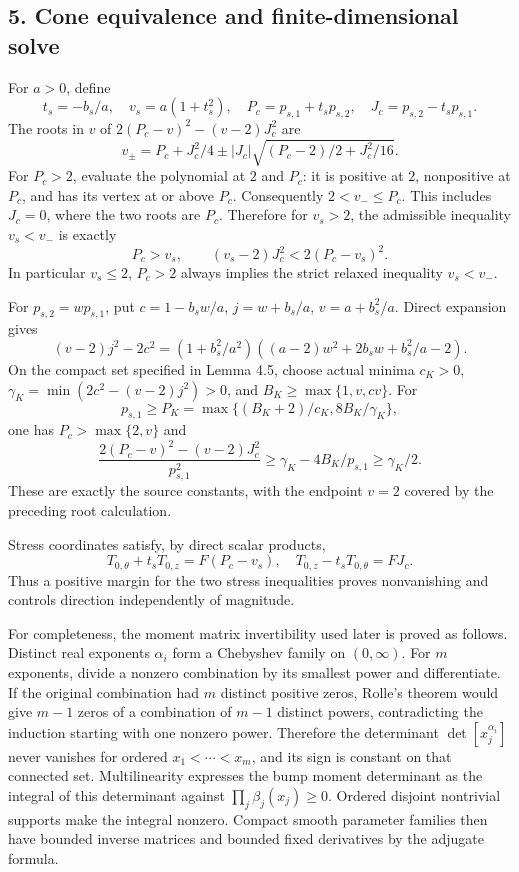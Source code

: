 \documentclass[10pt,a4paper]{article}
\begin{document}
\subsection{5. Cone equivalence and finite-dimensional solve}

For \(a>0\), define
\[
t_s=-b_s/a,\quad v_s=a(1+t_s^2),\quad P_c=p_{s,1}+t_sp_{s,2},\quad
J_c=p_{s,2}-t_sp_{s,1}.
\]
The roots in \(v\) of \(2(P_c-v)^2-(v-2)J_c^2\) are
\[
v_\pm=P_c+J_c^2/4\pm |J_c|\sqrt{(P_c-2)/2+J_c^2/16}.
\]
For \(P_c>2\), evaluate the polynomial at \(2\) and \(P_c\): it is positive at \(2\), nonpositive at \(P_c\), and has its vertex at or above \(P_c\). Consequently \(2<v_-\le P_c\). This includes \(J_c=0\), where the two roots are \(P_c\). Therefore for \(v_s>2\), the admissible inequality \(v_s<v_-\) is exactly
\[
P_c>v_s,\qquad (v_s-2)J_c^2<2(P_c-v_s)^2.
\]
In particular \(v_s\le2\), \(P_c>2\) always implies the strict relaxed inequality \(v_s<v_-\).

For \(p_{s,2}=wp_{s,1}\), put \(c=1-b_sw/a\), \(j=w+b_s/a\), \(v=a+b_s^2/a\). Direct expansion gives
\[
(v-2)j^2-2c^2=(1+b_s^2/a^2)((a-2)w^2+2b_sw+b_s^2/a-2).
\]
On the compact set specified in Lemma 4.5, choose actual minima \(c_K>0\), \(\gamma_K=\min(2c^2-(v-2)j^2)>0\), and \(B_K\ge\max\{1,v,cv\}\). For
\[
p_{s,1}\ge P_K=\max\{(B_K+2)/c_K,8B_K/\gamma_K\},
\]
one has \(P_c>\max\{2,v\}\) and
\[
\frac{2(P_c-v)^2-(v-2)J_c^2}{p_{s,1}^2}
\ge\gamma_K-4B_K/p_{s,1}\ge\gamma_K/2.
\]
These are exactly the source constants, with the endpoint \(v=2\) covered by the preceding root calculation.

Stress coordinates satisfy, by direct scalar products,
\[
T_{0,\theta}+t_sT_{0,z}=F(P_c-v_s),\quad
T_{0,z}-t_sT_{0,\theta}=FJ_c.
\]
Thus a positive margin for the two stress inequalities proves nonvanishing and controls direction independently of magnitude.

For completeness, the moment matrix invertibility used later is proved as follows. Distinct real exponents \(\alpha_i\) form a Chebyshev family on \((0,\infty)\). For \(m\) exponents, divide a nonzero combination by its smallest power and differentiate. If the original combination had \(m\) distinct positive zeros, Rolle's theorem would give \(m-1\) zeros of a combination of \(m-1\) distinct powers, contradicting the induction starting with one nonzero power. Therefore the determinant \(\det[x_j^{\alpha_i}]\) never vanishes for ordered \(x_1<\cdots<x_m\), and its sign is constant on that connected set. Multilinearity expresses the bump moment determinant as the integral of this determinant against \(\prod_j\beta_j(x_j)\ge0\). Ordered disjoint nontrivial supports make the integral nonzero. Compact smooth parameter families then have bounded inverse matrices and bounded fixed derivatives by the adjugate formula.
\end{document}
